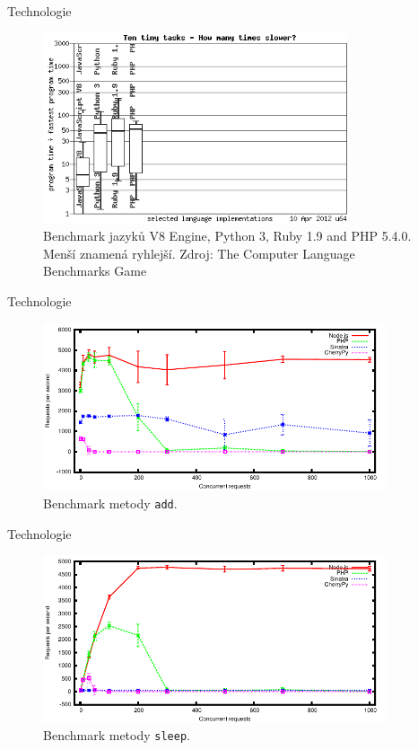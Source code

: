 \documentclass[xcolor=dvipsnames]{beamer}
\begin{document}
	\begin{frame}{Technologie}
		\begin{figure}[htb]
	  \centering
	    \includegraphics[width=0.8\textwidth]{../tex/bench2.png}
		  \caption{Benchmark jazyků V8 Engine, Python 3, Ruby 1.9 and PHP 5.4.0. Menší znamená ryhlejší. Zdroj: The Computer Language Benchmarks Game}
		  \label{fig:bench1}
		\end{figure}
	\end{frame}
	\begin{frame}{Technologie}
				\begin{figure}[h!]
	  \centering
	    \includegraphics[width=0.9\textwidth]{../tex/plot_add.pdf}
		  \caption{Benchmark metody \texttt{add}.}
		  \label{fig:bench_add}
		\end{figure}		

	\end{frame}
	\begin{frame}{Technologie}
			\begin{figure}[h!]
	  \centering
	    \includegraphics[width=0.9\textwidth]{../tex/plot_sleep.pdf}
		  \caption{Benchmark metody \texttt{sleep}.}
		  \label{fig:bench_sleep}
		\end{figure}
  \end{frame}
\end{document}
